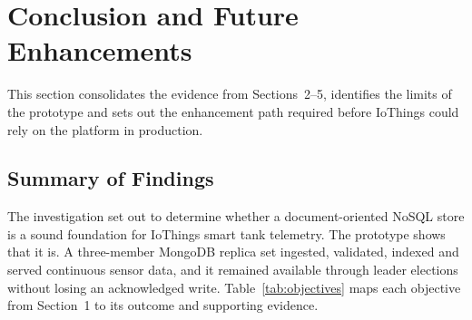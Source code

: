 \documentclass[11pt,a4paper]{article}
\begin{document}
\section{Conclusion and Future Enhancements}

This section consolidates the evidence from Sections~2--5, identifies the limits of the prototype and sets out the enhancement path required before IoThings could rely on the platform in production.

\subsection{Summary of Findings}
The investigation set out to determine whether a document-oriented NoSQL store is a sound foundation for IoThings smart tank telemetry. The prototype shows that it is. A three-member MongoDB replica set ingested, validated, indexed and served continuous sensor data, and it remained available through leader elections without losing an acknowledged write. Table~\ref{tab:objectives} maps each objective from Section~1 to its outcome and supporting evidence.
\end{document}
